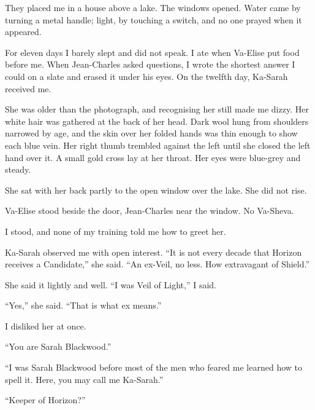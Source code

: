 They placed me in a house above a lake. The windows opened. Water came by turning a metal handle; light, by touching a switch, and no one prayed when it appeared.\par

For eleven days I barely slept and did not speak. I ate when Va-Elise put food before me. When Jean-Charles asked questions, I wrote the shortest answer I could on a slate and erased it under his eyes. On the twelfth day, Ka-Sarah received me.\par

She was older than the photograph, and recognising her still made me dizzy. Her white hair was gathered at the back of her head. Dark wool hung from shoulders narrowed by age, and the skin over her folded hands was thin enough to show each blue vein. Her right thumb trembled against the left until she closed the left hand over it. A small gold cross lay at her throat. Her eyes were blue-grey and steady.\par

She sat with her back partly to the open window over the lake. She did not rise.\par

Va-Elise stood beside the door, Jean-Charles near the window. No Va-Sheva.\par

I stood, and none of my training told me how to greet her.\par

Ka-Sarah observed me with open interest. ``It is not every decade that Horizon receives a Candidate,'' she said. ``An ex-Veil, no less. How extravagant of Shield.''\par

She said it lightly and well. ``I was Veil of Light,'' I said.\par

``Yes,'' she said. ``That is what ex means.''\par

I disliked her at once.\par

``You are Sarah Blackwood.''\par

``I was Sarah Blackwood before most of the men who feared me learned how to spell it. Here, you may call me Ka-Sarah.''\par

``Keeper of Horizon?''\par


